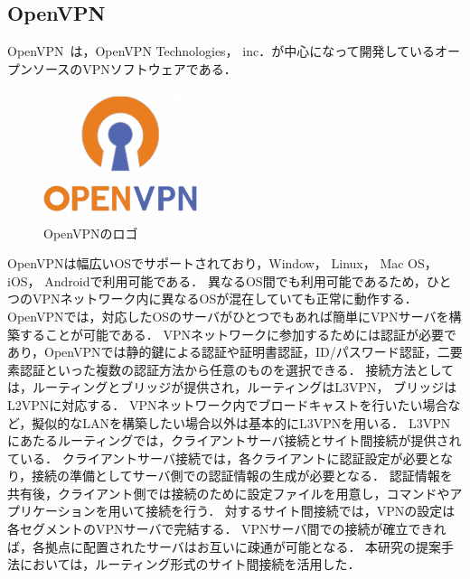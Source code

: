 \subsection{OpenVPN}

OpenVPN~\cite{OpenVPN}は，OpenVPN Technologies， inc．が中心になって開発しているオープンソースのVPNソフトウェアである．

\begin{figure}[htbp]
\begin{center}
    \includegraphics[width=0.4\textwidth]{./figures/openvpn-logo.png}
    \caption{OpenVPNのロゴ}
\end{center}
\end{figure}

OpenVPNは幅広いOSでサポートされており，Window， Linux， Mac OS， iOS， Androidで利用可能である．
異なるOS間でも利用可能であるため，ひとつのVPNネットワーク内に異なるOSが混在していても正常に動作する．
OpenVPNでは，対応したOSのサーバがひとつでもあれば簡単にVPNサーバを構築することが可能である．
VPNネットワークに参加するためには認証が必要であり，OpenVPNでは静的鍵による認証や証明書認証，ID/パスワード認証，二要素認証といった複数の認証方法から任意のものを選択できる．
接続方法としては，ルーティングとブリッジが提供され，ルーティングはL3VPN， ブリッジはL2VPNに対応する．
VPNネットワーク内でブロードキャストを行いたい場合など，擬似的なLANを構築したい場合以外は基本的にL3VPNを用いる．
L3VPNにあたるルーティングでは，クライアントサーバ接続とサイト間接続が提供されている．
クライアントサーバ接続では，各クライアントに認証設定が必要となり，接続の準備としてサーバ側での認証情報の生成が必要となる．
認証情報を共有後，クライアント側では接続のために設定ファイルを用意し，コマンドやアプリケーションを用いて接続を行う．
対するサイト間接続では，VPNの設定は各セグメントのVPNサーバで完結する．
VPNサーバ間での接続が確立できれば，各拠点に配置されたサーバはお互いに疎通が可能となる．
本研究の提案手法においては，ルーティング形式のサイト間接続を活用した．
